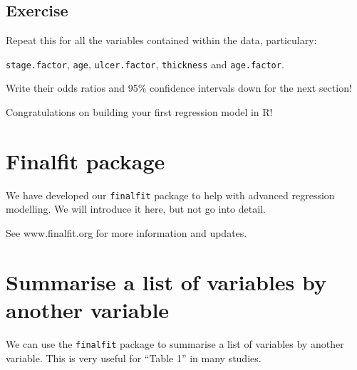 \documentclass[12pt,]{krantz}
\makeatletter
\newenvironment{Shaded}{\begin{snugshade}}{\end{snugshade}}
\newcommand{\DataTypeTok}[1]{\textcolor[rgb]{0.13,0.29,0.53}{#1}}
\newcommand{\KeywordTok}[1]{\textcolor[rgb]{0.13,0.29,0.53}{\textbf{#1}}}
\newcommand{\NormalTok}[1]{#1}
\newcommand{\OperatorTok}[1]{\textcolor[rgb]{0.81,0.36,0.00}{\textbf{#1}}}
\newcommand{\OtherTok}[1]{\textcolor[rgb]{0.56,0.35,0.01}{#1}}
\newcommand{\StringTok}[1]{\textcolor[rgb]{0.31,0.60,0.02}{#1}}
\newenvironment{kframe}{%
\medskip{}
\setlength{\fboxsep}{.8em}
 \def\at@end@of@kframe{}%
 \ifinner\ifhmode%
  \def\at@end@of@kframe{\end{minipage}}%
  \begin{minipage}{\columnwidth}%
 \fi\fi%
 \def\FrameCommand##1{\hskip\@totalleftmargin \hskip-\fboxsep
 \colorbox{shadecolor}{##1}\hskip-\fboxsep
     \hskip-\linewidth \hskip-\@totalleftmargin \hskip\columnwidth}%
 \MakeFramed {\advance\hsize-\width
   \@totalleftmargin\z@ \linewidth\hsize
   \@setminipage}}%
 {\par\unskip\endMakeFramed%
 \at@end@of@kframe}
\renewenvironment{Shaded}{\begin{kframe}}{\end{kframe}}
\theoremstyle{definition}
\theoremstyle{definition}
\theoremstyle{definition}
\theoremstyle{remark}
\makeatother
\begin{document}
\hypertarget{exercise-28}{%
\subsection{Exercise}\label{exercise-28}}

Repeat this for all the variables contained within the data,
particulary:

\texttt{stage.factor}, \texttt{age}, \texttt{ulcer.factor},
\texttt{thickness} and \texttt{age.factor}.

Write their odds ratios and 95\% confidence intervals down for the next
section!

Congratulations on building your first regression model in R!

\hypertarget{finalfit-package}{%
\section{Finalfit package}\label{finalfit-package}}

We have developed our \texttt{finalfit} package to help with advanced
regression modelling. We will introduce it here, but not go into detail.

See www.finalfit.org for more information and updates.

\hypertarget{summarise-a-list-of-variables-by-another-variable}{%
\section{Summarise a list of variables by another
variable}\label{summarise-a-list-of-variables-by-another-variable}}

We can use the \texttt{finalfit} package to summarise a list of
variables by another variable. This is very useful for ``Table 1'' in
many studies.

\begin{Shaded}
\end{Shaded}
\end{document}
